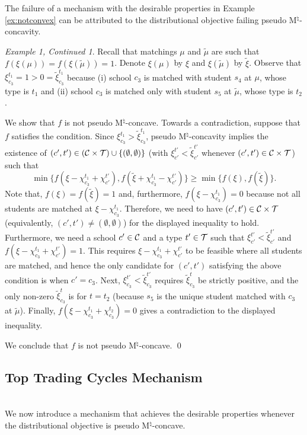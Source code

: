 \documentclass[12pt]{amsart}
\theoremstyle{remark}
\newtheorem*{ex}{Example 1, Continued}
\begin{document}
The failure of a mechanism with the desirable properties in Example \ref{ex:notconvex} can be
attributed to the distributional objective failing pseudo M$^{\natural}$-concavity.

\begin{ex}
Recall that matchings $\mu$ and $\tilde \mu$
are such that $f(\xi(\mu))=f(\xi(\tilde \mu))=1$. Denote $\xi(\mu)$ by $\xi$ and $\xi(\tilde \mu)$ by $\tilde{\xi}$. Observe that $\xi_{c_3}^{t_1}=1>0=\tilde{\xi}_{c_3}^{t_1}$ because
(i) school $c_3$ is matched with student $s_4$ at $\mu$, whose type is $t_1$ and (ii) school $c_3$ is matched only
with student $s_5$ at $\tilde \mu$, whose type is $t_2$.

We show that $f$ is not pseudo M$^{\natural}$-concave. Towards a contradiction, suppose that $f$ satisfies the condition.
Since $\xi_{c_3}^{t_1}>\tilde{\xi}_{c_3}^{t_1}$, pseudo M$^{\natural}$-concavity implies
the existence of $(c',t') \in (\mathcal{C} \times \mathcal{T})\cup \{(\emptyset,\emptyset)\}$
(with $\xi_{c'}^{t'}<\tilde{\xi}_{c'}^{t'}$ whenever $(c',t') \in \mathcal{C} \times \mathcal{T}$) such that
\begin{equation*}
  \min \{f(\xi-\chi_{c_3}^{t_1}+\chi_{c'}^{t'}), f(\tilde{\xi}+\chi_{c_3}^{t_1}-\chi_{c'}^{t'})\} \geq \min \{f(\xi),f(\tilde{\xi})\}.
\end{equation*}
Note that, $f(\xi) = f(\tilde{\xi}) = 1$ and, furthermore,  $f(\xi-\chi_{c_3}^{t_1}) = 0$ because
not all students are matched at $\xi-\chi_{c_3}^{t_1}$.
Therefore, we need to have $(c',t') \in \mathcal{C} \times \mathcal{T}$ (equivalently, $(c',t') \neq (\emptyset,\emptyset)$) for the displayed inequality to hold.
Furthermore, we need a school $c'\in \mathcal{C}$ and a type $t'\in \mathcal{T}$ such that
$\xi_{c'}^{t'}<\tilde{\xi}_{c'}^{t'}$ and $f(\xi-\chi_{c_3}^{t_1}+\chi_{c'}^{t'}) = 1$. This requires $\xi-\chi_{c_3}^{t_1}+\chi_{c'}^{t'}$ to be feasible where
all students are matched, and hence the only candidate for $(c',t')$ satisfying the above condition is
when $c'=c_3$. Next, $\xi_{c_3}^{t'}<\tilde{\xi}_{c_3}^{t'}$ requires $\tilde{\xi}_{c_3}^t$ be  strictly positive, and the only non-zero $\tilde{\xi}_{c_3}^t$ is for $t=t_2$
(because $s_5$ is the unique student matched with $c_3$ at $\tilde \mu$). Finally, $f(\xi-\chi_{c_3}^{t_1}+\chi_{c_3}^{t_2})=0$
gives a contradiction to the displayed inequality.

We conclude that $f$ is not pseudo M$^{\natural}$-concave.
\qed
\end{ex}

\subsection{Top Trading Cycles Mechanism}\label{ttc_sec}\hfill\\
We now introduce a mechanism that achieves the desirable properties %
whenever the distributional objective is pseudo M$^{\natural}$-concave.
\end{document}
